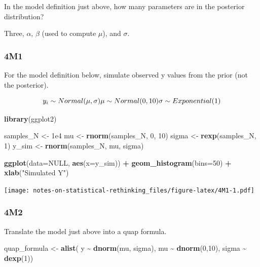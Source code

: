 \documentclass[
]{book}
\newenvironment{Shaded}{\begin{snugshade}}{\end{snugshade}}
\newcommand{\DataTypeTok}[1]{\textcolor[rgb]{0.13,0.29,0.53}{#1}}
\newcommand{\DecValTok}[1]{\textcolor[rgb]{0.00,0.00,0.81}{#1}}
\newcommand{\FloatTok}[1]{\textcolor[rgb]{0.00,0.00,0.81}{#1}}
\newcommand{\KeywordTok}[1]{\textcolor[rgb]{0.13,0.29,0.53}{\textbf{#1}}}
\newcommand{\NormalTok}[1]{#1}
\newcommand{\OperatorTok}[1]{\textcolor[rgb]{0.81,0.36,0.00}{\textbf{#1}}}
\newcommand{\OtherTok}[1]{\textcolor[rgb]{0.56,0.35,0.01}{#1}}
\newcommand{\StringTok}[1]{\textcolor[rgb]{0.31,0.60,0.02}{#1}}
\begin{document}
In the model definition just above, how many parameters are in the posterior distribution?

Three, \(α\), \(β\) (used to compute \(\mu\)), and \(\sigma\).

\hypertarget{m1-2}{%
\subsubsection*{4M1}\label{m1-2}}

For the model definition below, simulate observed y values from the prior (not the posterior).

\[y_i \sim Normal(\mu,\sigma) \\
\mu \sim Normal(0, 10) \\
\sigma \sim Exponential(1)\]

\begin{Shaded}
\begin{Highlighting}[]
\KeywordTok{library}\NormalTok{(ggplot2)}

\NormalTok{samples\_N \textless{}{-}}\StringTok{ }\FloatTok{1e4}
\NormalTok{mu \textless{}{-}}\StringTok{ }\KeywordTok{rnorm}\NormalTok{(samples\_N, }\DecValTok{0}\NormalTok{, }\DecValTok{10}\NormalTok{)}
\NormalTok{sigma \textless{}{-}}\StringTok{ }\KeywordTok{rexp}\NormalTok{(samples\_N, }\DecValTok{1}\NormalTok{)}
\NormalTok{y\_sim \textless{}{-}}\StringTok{ }\KeywordTok{rnorm}\NormalTok{(samples\_N, mu, sigma)}

\KeywordTok{ggplot}\NormalTok{(}\DataTypeTok{data=}\OtherTok{NULL}\NormalTok{, }\KeywordTok{aes}\NormalTok{(}\DataTypeTok{x=}\NormalTok{y\_sim)) }\OperatorTok{+}\StringTok{ }
\StringTok{  }\KeywordTok{geom\_histogram}\NormalTok{(}\DataTypeTok{bins=}\DecValTok{50}\NormalTok{) }\OperatorTok{+}\StringTok{ }
\StringTok{  }\KeywordTok{xlab}\NormalTok{(}\StringTok{"Simulated Y"}\NormalTok{)}
\end{Highlighting}
\end{Shaded}

\texttt{[image: notes-on-statistical-rethinking\_files/figure-latex/4M1-1.pdf]}

\hypertarget{m2-2}{%
\subsubsection*{4M2}\label{m2-2}}

Translate the model just above into a quap formula.

\begin{Shaded}
\begin{Highlighting}[]
\NormalTok{quap\_formula \textless{}{-}}\StringTok{ }\KeywordTok{alist}\NormalTok{(}
\NormalTok{  y }\OperatorTok{\textasciitilde{}}\StringTok{ }\KeywordTok{dnorm}\NormalTok{(mu, sigma),}
\NormalTok{  mu }\OperatorTok{\textasciitilde{}}\StringTok{ }\KeywordTok{dnorm}\NormalTok{(}\DecValTok{0}\NormalTok{,}\DecValTok{10}\NormalTok{),}
\NormalTok{  sigma }\OperatorTok{\textasciitilde{}}\StringTok{ }\KeywordTok{dexp}\NormalTok{(}\DecValTok{1}\NormalTok{))}
\end{Highlighting}
\end{Shaded}
\end{document}
